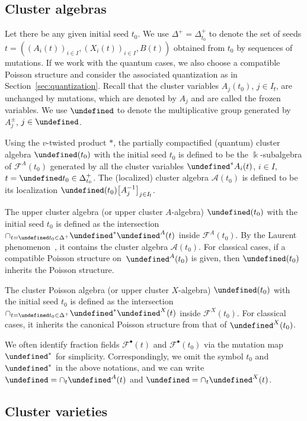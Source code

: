 \documentclass[10pt,a4paper]{amsart}
\newcommand{\kk}{\Bbbk}
\newcommand{\opname}[1]{\operatorname{\mathsf{#1}}}
\newcommand{\cA}{{\mathcal A}}
\newcommand{\cF}{{\mathcal F}}
\newcommand{\clAlg}{{\cA}}%
\newcommand{\fv}{\opname{f}}
\let\Ifv\undefined
\let\upClAlg\undefined
\let\XClAlg\undefined
\let\LP\undefined
\let\bClAlg\undefined
\let\fFac\undefined
\let\seq\undefined
\newcommand{\Ifv}{I_{\fv}}
\newcommand{\upClAlg}{\mathcal{U}^A}
\newcommand{\XClAlg}{\mathcal{U}^X}
\newcommand{\LP}{{\mathcal{LP}}}
\newcommand{\bClAlg}{{\overline{\clAlg}}}
\newcommand{\fFac}{\mathcal{Z}}
\newcommand{\seq}{\boldsymbol{\mu}}%
\numberwithin{equation}{section}
\begin{document}
\subsection{Cluster algebras}

Let there be any given initial seed $t_{0}$. We use $\Delta^{+}=\Delta_{t_{0}}^{+}$
to denote the set of seeds $t=((A_{i}(t))_{i\in I},(X_{i}(t))_{i\in I},B(t))$
obtained from $t_{0}$ by sequences of mutations. If we work with the quantum cases, we also choose a compatible Poisson structure and consider the associated quantization as in Section~\ref{sec:quantization}. Recall that the
cluster variables $A_{j}(t_{0})$, $j\in I_{\fv}$, are unchanged
by mutations, which are denoted by $A_{j}$ and are called the frozen
variables. We use $\fFac$ to denote the multiplicative group generated
by $A_{j}^{\pm}$, $j\in\Ifv$.

Using the $v$-twisted product $*$, the partially compactified (quantum) cluster algebra $\bClAlg(t_{0})$ with
the initial seed $t_{0}$ is defined to be the $\kk$-subalgebra of
$\cF^{A}(t_{0})$ generated by all the cluster variables $\seq^{*}A_{i}(t)$,
$i\in I$, $t=\seq t_{0}\in\Delta_{t_{0}}^{+}$. The (localized) cluster
algebra $\clAlg(t_{0})$ is defined to be its localization $\bClAlg(t_{0})\big[A_{j}^{-1}\big]_{j\in I_{\fv}}$.

The upper cluster algebra (or upper cluster $A$-algebra) $\upClAlg(t_{0})$
with the initial seed $t_{0}$ is defined as the intersection $\cap_{t=\seq t_{0}\in\Delta^{+}}\seq^{*}\LP^{A}(t)$
inside $\cF^{A}(t_{0})$. By the Laurent phenomenon~\cite{BerensteinZelevinsky05,FominZelevinsky02},
it contains the cluster algebra $\clAlg(t_{0})$. For classical cases, if a compatible
Poisson structure on~$\LP^{A}(t_{0})$ is given, then $\upClAlg(t_{0})$
inherits the Poisson structure.

The cluster Poisson algebra (or upper cluster $X$-algebra) $\XClAlg(t_{0})$
with the initial seed $t_{0}$ is defined as the intersection $\cap_{t=\seq t_{0}\in\Delta^{+}}\seq^{*}\LP^{X}(t)$
inside $\cF^{X}(t_{0})$. For classical cases, it inherits the canonical Poisson structure
from that of $\LP^{X}(t_{0})$.

We often identify fraction fields $\cF^{\bullet}(t)$ and $\cF^{\bullet}(t_{0})$
via the mutation map $\seq^{*}$ for simplicity. Correspondingly,
we omit the symbol $t_{0}$ and $\seq^{*}$ in the above notations,
and we can write~${\upClAlg=\cap_{t}\LP^{A}(t)}$ and $\XClAlg=\cap_{t}\LP^{X}(t)$.

\subsection{Cluster varieties}
\end{document}
